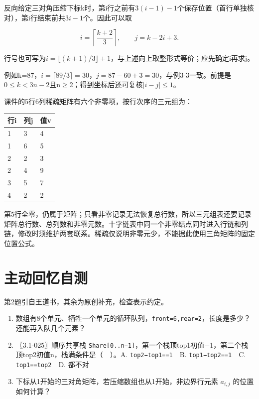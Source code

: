 反向给定三对角压缩下标k时，第i行之前有\(3(i-1)-1\)个保存位置（首行单独核对），第i行结束前共\(3i-1\)个。因此可以取

\[i=\left\lceil\frac{k+2}{3}\right\rceil,\qquad j=k-2i+3.\]

行号也可写为\(i=\lfloor(k+1)/3\rfloor+1\)，与上述向上取整形式等价；应先确定i再求j。

例如k=87，\(i=\lceil89/3\rceil=30\)，\(j=87-60+3=30\)，与例3-3一致。前提是\(0\le k<3n-2\)且n\ensuremath{\ge}2；得到坐标后还可复核\(|i-j|\le1\)。

课件的5行6列稀疏矩阵有六个非零项，按行次序的三元组为：

\par\medskip\noindent\begin{minipage}{\linewidth}\fontsize{9.3}{12}\selectfont\begin{tabularx}{\linewidth}{@{}YYY@{}}
\toprule\noalign{}
行i & 列j & 值v \\
\midrule\noalign{}


1 & 3 & 4 \\
1 & 6 & 5 \\
2 & 2 & 3 \\
2 & 4 & 9 \\
3 & 5 & 7 \\
4 & 2 & 2 \\
\bottomrule\end{tabularx}
\end{minipage}\par\medskip

第5行全零，仍属于矩阵；只看非零记录无法恢复总行数，所以三元组表还要记录矩阵总行数、总列数和非零元数。十字链表中同一个非零结点同时进入行链和列链，修改时须维护两套联系。稀疏仅说明非零元少，不能据此使用三角矩阵的固定位置公式。

\section{主动回忆自测}\label{DS03-check}

第2题引自王道书，其余为原创补充，检查表示约定。

\begin{enumerate}
\def\labelenumi{\arabic{enumi}.}
\tightlist
\item
  数组有8个单元、牺牲一个单元的循环队列，\texttt{front=\allowbreak{}6,\allowbreak{}rear=\allowbreak{}2}，长度是多少？还能再入队几个元素？
\item
  〖3.1-025〗顺序共享栈 \texttt{Share[\allowbreak{}0.\allowbreak{}.\allowbreak{}n−1]\allowbreak{}}，第一个栈顶top1初值\ensuremath{-}1，第二个栈顶top2初值n，栈满条件是（　）。A. \texttt{top2−top1=\allowbreak{}=\allowbreak{}1}　B. \texttt{top1−top2=\allowbreak{}=\allowbreak{}1}　C. \texttt{top1=\allowbreak{}=\allowbreak{}top2}　D. 都不对
\item
  下标从1开始的三对角矩阵，若压缩数组也从1开始，非边界行元素 \(a_{i,j}\) 的位置如何计算？
\end{enumerate}

